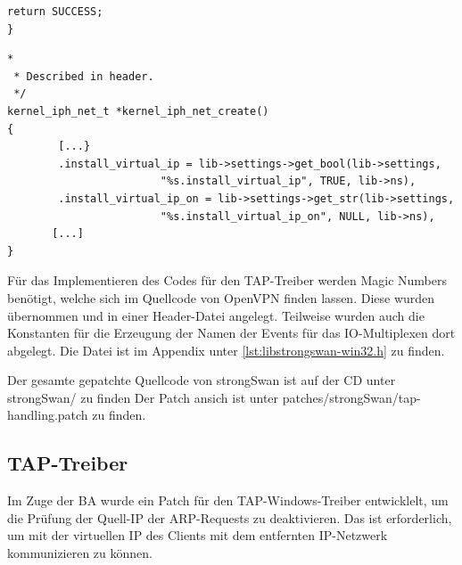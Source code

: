 {\begin{lstlisting}[caption=Code für del\_ip,label=lst:kernel_iph_del_ip]
        return SUCCESS;
}
\end{lstlisting}

\begin{lstlisting}[caption=Ergänzung zu kernel\_iph\_net\_create(),label=lst:kernel_iph_create]
*
 * Described in header.
 */
kernel_iph_net_t *kernel_iph_net_create()
{
        [...}
        .install_virtual_ip = lib->settings->get_bool(lib->settings,
                        "%s.install_virtual_ip", TRUE, lib->ns),
        .install_virtual_ip_on = lib->settings->get_str(lib->settings,
                        "%s.install_virtual_ip_on", NULL, lib->ns),
       [...]
}
\end{lstlisting}

Für das Implementieren des Codes für den TAP-Treiber werden Magic Numbers benötigt,
welche sich im Quellcode von OpenVPN finden lassen. Diese wurden übernommen
und in einer Header-Datei angelegt.
Teilweise wurden auch die Konstanten für die Erzeugung der Namen der Events für
das IO-Multiplexen dort abgelegt. Die Datei ist im Appendix unter \autoref{lst:libstrongswan-win32.h}
zu finden.

Der gesamte gepatchte Quellcode von strongSwan ist auf der CD unter strongSwan/ zu finden
Der Patch ansich ist unter patches/strongSwan/tap-handling.patch zu finden.

\subsection{TAP-Treiber}
Im Zuge der \ac{BA} wurde ein Patch für den TAP-Windows-Treiber entwicklelt, um die
Prüfung der Quell-IP der ARP-Requests zu deaktivieren. Das ist erforderlich, um mit der
virtuellen IP des Clients mit dem entfernten IP-Netzwerk kommunizieren zu können.


}
